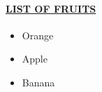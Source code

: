 \documentclass{article}
\begin{document}
	\paragraph{\underline{LIST OF FRUITS}}
	\begin{itemize}
		\item Orange
		\item Apple
		\item Banana
	\end{itemize}
\end{document}
